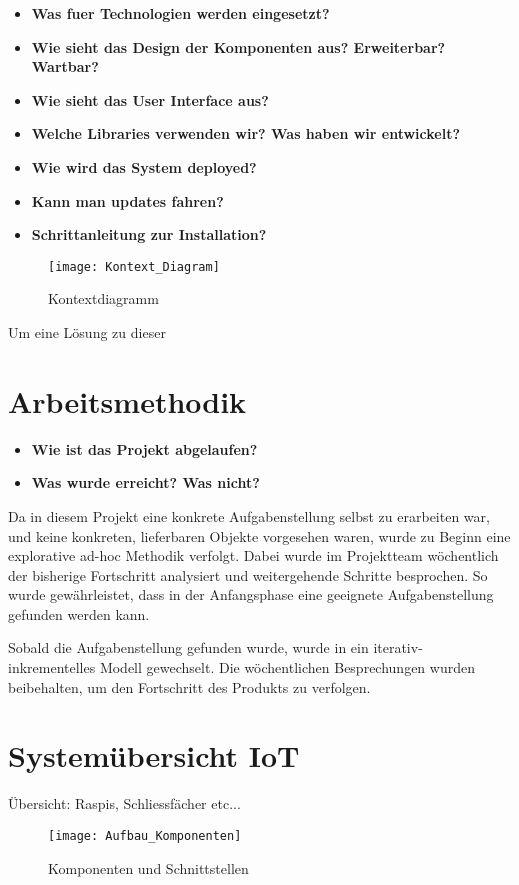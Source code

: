 \begin{itemize}
    \item \textbf{ Was fuer Technologien werden eingesetzt?} 
    \item \textbf{ Wie sieht das Design der Komponenten aus? Erweiterbar? Wartbar?} 
    \item \textbf{ Wie sieht das User Interface aus?} 
    \item \textbf{ Welche Libraries verwenden wir? Was haben wir entwickelt?}
    \item \textbf{ Wie wird das System deployed?}
    \item \textbf{ Kann man updates fahren?}
    \item \textbf{ Schrittanleitung zur Installation?}
\end{itemize}
    
    
\begin{figure}
\centering
\texttt{[image: Kontext\_Diagram]}
\caption{Kontextdiagramm}
\label{fig:Aufbau Komponenten und Schnittstellen}
\end{figure}
Um eine Lösung zu dieser 

\section{Arbeitsmethodik}
\begin{itemize}
    \item \textbf{Wie ist das Projekt abgelaufen?}
    \item \textbf{Was wurde erreicht? Was nicht?}
\end{itemize}
Da in diesem Projekt eine konkrete Aufgabenstellung selbst zu erarbeiten war, und keine konkreten, lieferbaren Objekte vorgesehen waren, wurde zu Beginn eine explorative ad-hoc Methodik verfolgt. Dabei wurde im Projektteam wöchentlich der bisherige Fortschritt analysiert und weitergehende Schritte besprochen. So wurde gewährleistet, dass in der Anfangsphase eine geeignete Aufgabenstellung gefunden werden kann.
\par
Sobald die Aufgabenstellung gefunden wurde, wurde in ein iterativ- inkrementelles Modell gewechselt. Die wöchentlichen Besprechungen wurden beibehalten, um den Fortschritt des Produkts zu verfolgen.

\section{Systemübersicht IoT}
\label{sec:Setup_IoT}
Übersicht: Raspis, Schliessfächer etc...
\begin{figure}
\centering
\texttt{[image: Aufbau\_Komponenten]}
\caption{Komponenten und Schnittstellen}
\label{fig:Aufbau Komponenten}
\end{figure}
